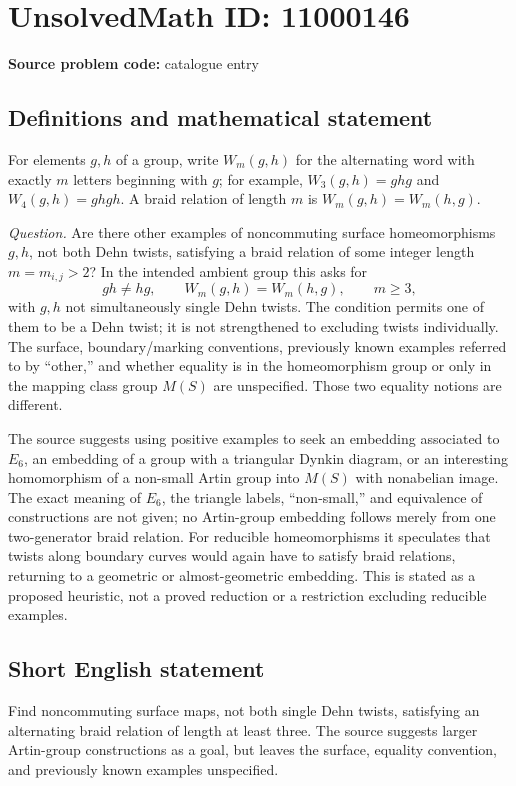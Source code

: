 \documentclass[11pt]{article}
\begin{document}
\section*{UnsolvedMath ID: 11000146}
\textbf{Source problem code:} catalogue entry
\subsection{Definitions and mathematical statement}
For elements \(g,h\) of a group, write \(W_m(g,h)\) for the alternating word with exactly \(m\) letters beginning with \(g\); for example, \(W_3(g,h)=ghg\) and \(W_4(g,h)=ghgh\). A braid relation of length \(m\) is \(W_m(g,h)=W_m(h,g)\).

\emph{Question.} Are there other examples of noncommuting surface homeomorphisms \(g,h\), not both Dehn twists, satisfying a braid relation of some integer length \(m=m_{i,j}>2\)? In the intended ambient group this asks for
\[
 gh\neq hg,\qquad
 W_m(g,h)=W_m(h,g),\qquad m\geq3,
\]
with \(g,h\) not simultaneously single Dehn twists. The condition permits one of them to be a Dehn twist; it is not strengthened to excluding twists individually. The surface, boundary/marking conventions, previously known examples referred to by ``other,'' and whether equality is in the homeomorphism group or only in the mapping class group \(M(S)\) are unspecified. Those two equality notions are different.

The source suggests using positive examples to seek an embedding associated to \(E_6\), an embedding of a group with a triangular Dynkin diagram, or an interesting homomorphism of a non-small Artin group into \(M(S)\) with nonabelian image. The exact meaning of \(E_6\), the triangle labels, ``non-small,'' and equivalence of constructions are not given; no Artin-group embedding follows merely from one two-generator braid relation. For reducible homeomorphisms it speculates that twists along boundary curves would again have to satisfy braid relations, returning to a geometric or almost-geometric embedding. This is stated as a proposed heuristic, not a proved reduction or a restriction excluding reducible examples.
\subsection{Short English statement}
Find noncommuting surface maps, not both single Dehn twists, satisfying an alternating braid relation of length at least three. The source suggests larger Artin-group constructions as a goal, but leaves the surface, equality convention, and previously known examples unspecified.
\end{document}
